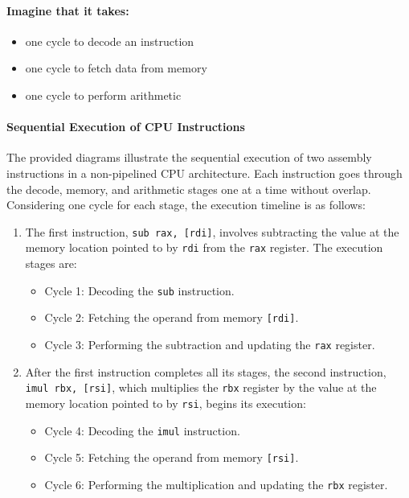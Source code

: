 \documentclass[12pt]{article}
\begin{document}
\paragraph{Imagine that it takes:}
\begin{itemize}
    \item one cycle to decode an instruction
    \item one cycle to fetch data from memory
    \item one cycle to perform arithmetic
\end{itemize}

\paragraph{Sequential Execution of CPU Instructions}

The provided diagrams illustrate the sequential execution of two assembly instructions in a non-pipelined CPU architecture. Each instruction goes through the decode, memory, and arithmetic stages one at a time without overlap. Considering one cycle for each stage, the execution timeline is as follows:

\begin{enumerate}
    \item The first instruction, \texttt{sub rax, [rdi]}, involves subtracting the value at the memory location pointed to by \texttt{rdi} from the \texttt{rax} register. The execution stages are:
    \begin{itemize}
        \item Cycle 1: Decoding the \texttt{sub} instruction.
        \item Cycle 2: Fetching the operand from memory \texttt{[rdi]}.
        \item Cycle 3: Performing the subtraction and updating the \texttt{rax} register.
    \end{itemize}
    \item After the first instruction completes all its stages, the second instruction, \texttt{imul rbx, [rsi]}, which multiplies the \texttt{rbx} register by the value at the memory location pointed to by \texttt{rsi}, begins its execution:
    \begin{itemize}
        \item Cycle 4: Decoding the \texttt{imul} instruction.
        \item Cycle 5: Fetching the operand from memory \texttt{[rsi]}.
        \item Cycle 6: Performing the multiplication and updating the \texttt{rbx} register.
    \end{itemize}
\end{enumerate}
\end{document}
